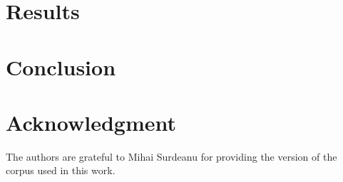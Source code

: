 \documentclass[11pt]{article}
\begin{document}
\section{Results}\label{sec:results}



\section{Conclusion} \label{sec:conclusion}



\section*{Acknowledgment}

The authors are grateful to Mihai Surdeanu for providing the version of
the corpus used in this work.



\end{document}
